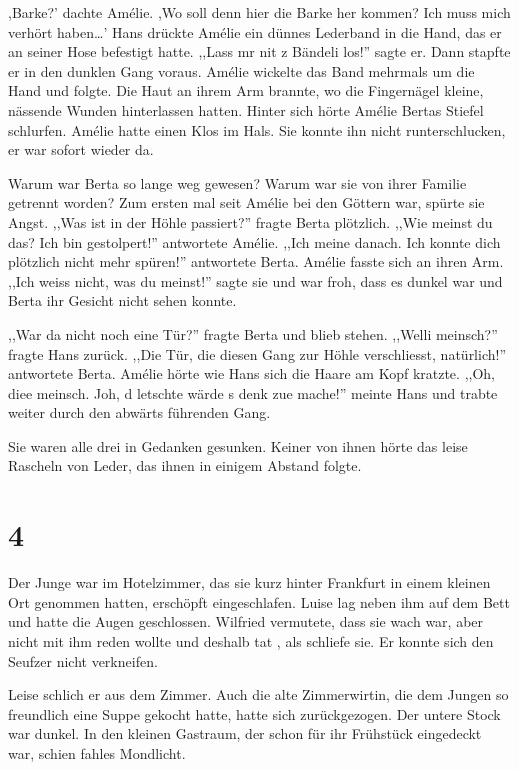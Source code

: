 \documentclass[11pt,titlepage,a5paper]{book}
\begin{document}
,Barke?' dachte Amélie. ,Wo soll denn hier die Barke her kommen? Ich muss mich verhört haben\dots ' Hans drückte Amélie ein dünnes Lederband in die Hand, das er an seiner Hose befestigt hatte. ,,Lass mr nit z Bändeli los!'' sagte er. Dann stapfte er in den dunklen Gang voraus. Amélie wickelte das Band mehrmals um die Hand und folgte. Die Haut an ihrem Arm brannte, wo die Fingernägel kleine, nässende Wunden hinterlassen hatten. Hinter sich hörte Amélie Bertas Stiefel schlurfen. Amélie hatte einen Klos im Hals. Sie konnte ihn nicht runterschlucken, er war sofort wieder da.

Warum war Berta so lange weg gewesen? Warum war sie von ihrer Familie getrennt worden? Zum ersten mal seit Amélie bei den Göttern war, spürte sie Angst. ,,Was ist in der Höhle passiert?'' fragte Berta plötzlich. ,,Wie meinst du das? Ich bin gestolpert!'' antwortete Amélie. ,,Ich meine danach. Ich konnte dich plötzlich nicht mehr spüren!'' antwortete Berta. Amélie fasste sich an ihren Arm. ,,Ich weiss nicht, was du meinst!'' sagte sie und war froh, dass es dunkel war und Berta ihr Gesicht nicht sehen konnte.

,,War da nicht noch eine Tür?'' fragte Berta und blieb stehen. ,,Welli meinsch?'' fragte Hans zurück. ,,Die Tür, die diesen Gang zur Höhle verschliesst, natürlich!'' antwortete Berta. Amélie hörte wie Hans sich die Haare am Kopf kratzte. ,,Oh, diee meinsch. Joh, d  letschte wärde s denk zue mache!'' meinte Hans und trabte weiter durch den abwärts führenden Gang. 

Sie waren alle drei in Gedanken gesunken. Keiner von ihnen hörte das leise Rascheln von Leder, das ihnen in einigem Abstand folgte.

\section*{4}

Der Junge war im Hotelzimmer, das sie kurz hinter Frankfurt in einem kleinen Ort genommen hatten, erschöpft eingeschlafen. Luise lag neben ihm auf dem Bett und hatte die Augen geschlossen. Wilfried vermutete, dass sie wach war, aber nicht mit ihm reden wollte und deshalb tat , als schliefe sie. Er konnte sich den Seufzer nicht verkneifen.

Leise schlich er aus dem Zimmer. Auch die alte Zimmerwirtin, die dem Jungen so freundlich eine Suppe gekocht hatte, hatte sich zurückgezogen. Der untere Stock war dunkel. In den kleinen Gastraum, der schon für ihr Frühstück eingedeckt war, schien fahles Mondlicht.
\end{document}
